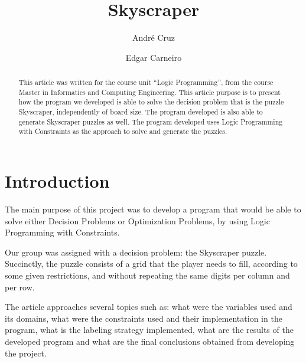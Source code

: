 \documentclass{llncs}
\begin{document}
\title{Skyscraper}
%
%
\author{André Cruz \and Edgar Carneiro}
%
%
%

\maketitle              %

\begin{abstract}
This article was written for the course unit ``Logic Programming'', from the course Master in Informatics and Computing Engineering.
This article purpose is to present how the program we developed is able to solve the decision problem that is the puzzle Skyscraper, independently of board size.
The program developed is also able to generate Skyscraper puzzles as well. The program developed uses Logic Programming with Constraints as the approach to solve and generate the puzzles.
\end{abstract}
%
\section{Introduction}
%
The main purpose of this project was to develop a program that would be able to solve either Decision Problems or Optimization Problems, by using Logic Programming with Constraints.

Our group was assigned with a decision problem: the Skyscraper puzzle. Succinctly, the puzzle consists of a grid that the player needs to fill, according to some given restrictions, and without repeating the same digits per column and per row.

The article approaches several topics such as: what were the variables used and its domains, what were the constraints used and their implementation in the program, what is the labeling strategy implemented, what are the results of the developed program and what are the final conclusions obtained from developing the project.
\end{document}
